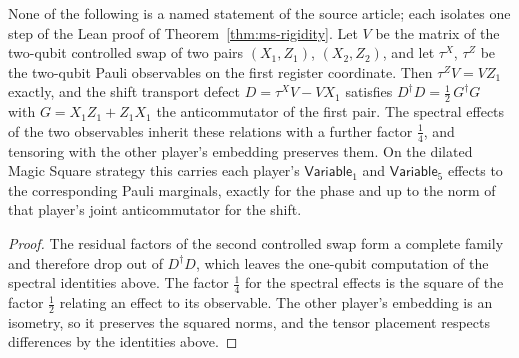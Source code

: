 \begin{lemma}
	None of the following is a named statement of the source article; each isolates one step of the Lean proof of Theorem~\ref{thm:ms-rigidity}. Let $V$ be the matrix of the two-qubit controlled swap of two pairs $(X_1, Z_1)$, $(X_2, Z_2)$, and let $\tau^X$, $\tau^Z$ be the two-qubit Pauli observables on the first register coordinate. Then $\tau^Z V = V Z_1$ exactly, and the shift transport defect $D = \tau^X V - V X_1$ satisfies $D^\dagger D = \tfrac12\, G^\dagger G$ with $G = X_1 Z_1 + Z_1 X_1$ the anticommutator of the first pair. The spectral effects of the two observables inherit these relations with a further factor $\tfrac14$, and tensoring with the other player's embedding preserves them. On the dilated Magic Square strategy this carries each player's $\mathsf{Variable}_1$ and $\mathsf{Variable}_5$ effects to the corresponding Pauli marginals, exactly for the phase and up to the norm of that player's joint anticommutator for the shift.
\end{lemma}
\begin{proof}
	\leanok
	The residual factors of the second controlled swap form a complete family and therefore drop out of $D^\dagger D$, which leaves the one-qubit computation of the spectral identities above. The factor $\tfrac14$ for the spectral effects is the square of the factor $\tfrac12$ relating an effect to its observable. The other player's embedding is an isometry, so it preserves the squared norms, and the tensor placement respects differences by the identities above.
\end{proof}

